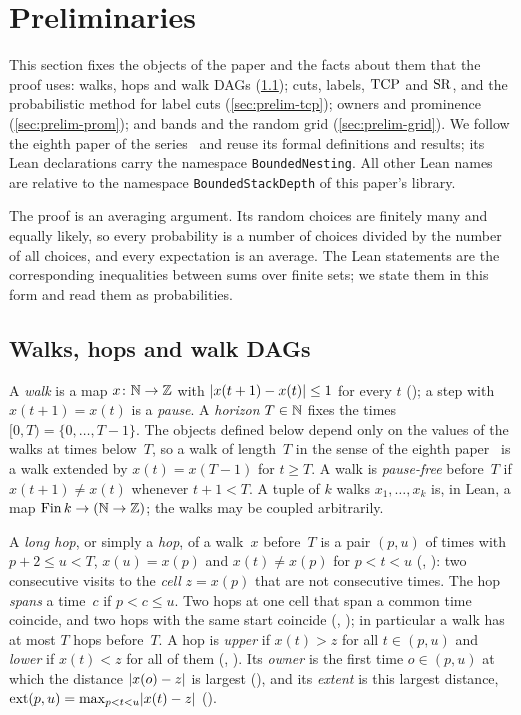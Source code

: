 \section{Preliminaries}\label{sec:prelim}

This section fixes the objects of the paper and the facts about them that the proof uses: walks, hops and walk DAGs
(\cref{sec:prelim-walks}); cuts, labels, $\mathrm{TCP}$ and $\mathrm{SR}$, and the probabilistic method for label cuts
(\cref{sec:prelim-tcp}); owners and prominence (\cref{sec:prelim-prom}); and bands and the random grid
(\cref{sec:prelim-grid}). We follow the eighth paper of the series~\cite{EighthPaper2026} and reuse its formal definitions
and results; its Lean declarations carry the namespace \texttt{BoundedNesting}. All other Lean names are relative to the
namespace \texttt{BoundedStackDepth} of this paper's library.

The proof is an averaging argument. Its random choices are finitely many and equally likely, so every probability is a
number of choices divided by the number of all choices, and every expectation is an average. The Lean statements are the
corresponding inequalities between sums over finite sets; we state them in this form and read them as probabilities.

\subsection{Walks, hops and walk DAGs}\label{sec:prelim-walks}

A \emph{walk} is a map $x\colon\mathbb{N}\to\mathbb{Z}$ with $\lvert x(t+1)-x(t) \rvert\le1$ for every $t$ (); a
step with $x(t+1)=x(t)$ is a \emph{pause}. A \emph{horizon} $T\in\mathbb{N}$ fixes the times $[0,T)=\{0,\dots,T-1\}$. The objects
defined below depend only on the values of the walks at times below~$T$, so a walk of length~$T$ in the sense of the eighth
paper~\cite[Section~2.2]{EighthPaper2026} is a walk extended by $x(t)=x(T-1)$ for $t\ge T$. A walk is \emph{pause-free}
before~$T$ if $x(t+1)\ne x(t)$ whenever $t+1<T$. A tuple of $k$ walks $x_1,\dots,x_k$ is, in Lean, a map
$\operatorname{Fin} k\to(\mathbb{N}\to\mathbb{Z})$; the walks may be coupled arbitrarily.

A \emph{long hop}, or simply a \emph{hop}, of a walk~$x$ before~$T$ is a pair $(p,u)$ of times with $p+2\le u<T$,
$x(u)=x(p)$ and $x(t)\ne x(p)$ for $p<t<u$ (, ): two consecutive
visits to the \emph{cell} $z=x(p)$ that are not consecutive times. The hop \emph{spans} a time~$c$ if $p<c\le u$. Two hops
at one cell that span a common time coincide, and two hops with the same start coincide
(, ); in particular a walk has at most $T$ hops
before~$T$. A hop is \emph{upper} if $x(t)>z$ for all $t\in(p,u)$ and \emph{lower} if $x(t)<z$ for all of them
(, ). Its \emph{owner} is the first time $o\in(p,u)$ at which
the distance $\lvert x(o)-z \rvert$ is largest (), and its \emph{extent} is this largest distance,
$\operatorname{ext}(p,u)=\max_{p<t<u}\lvert x(t)-z \rvert$ ().

